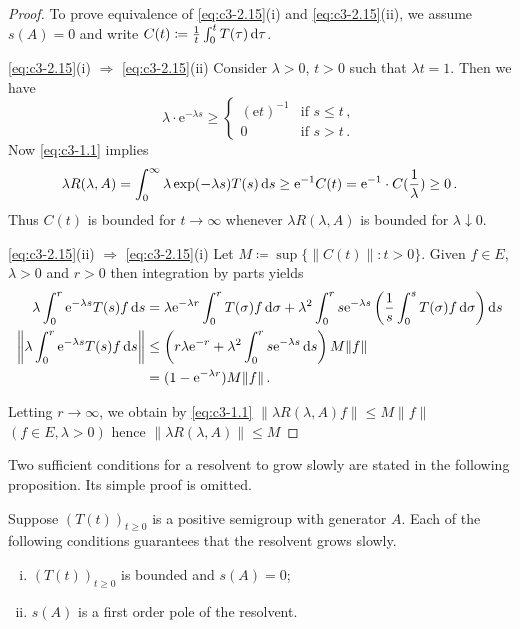 \begin{proof} 
To prove equivalence of \eqref{eq:c3-2.15}(i) and \eqref{eq:c3-2.15}(ii), we assume $s(A) = 0$ and write $C(t) \coloneqq \frac{1}{t} \int_{0}^{t} T(\tau) \mathop{}\!\mathrm{d}{\tau}$.

\eqref{eq:c3-2.15}(i) $\Rightarrow$ \eqref{eq:c3-2.15}(ii)\quad 
Consider $\lambda > 0$, $t > 0$ such that $\lambda t = 1$. 
Then we have
\[
\lambda \cdot \mathrm{e}^{-\lambda s} \geq 
\begin{cases}
	(\mathrm{e}t)^{-1} & \text{if } s \leq t\,, \\
	0 & \text{if } s > t\,.
\end{cases}
\]
Now \eqref{eq:c3-1.1} implies 
\[
\textit{$\lambda R(\lambda,A) = \int_{0}^{\infty} \lambda \exp(-\lambda s)T(s) \mathop{}\!\mathrm{d}{s} \geq \mathrm{e}^{-1}C(t) = \mathrm{e}^{-1}\cdot C(\frac{1}{\lambda}) \geq 0$}\,.
\]
Thus $C(t)$ is bounded for $t \to \infty$ whenever $\lambda R(\lambda,A)$ is bounded for $\lambda \downarrow 0$.

\eqref{eq:c3-2.15}(ii) $\Rightarrow$ \eqref{eq:c3-2.15}(i)\quad
 Let $M \coloneqq \sup\{\|C(t)\| : t > 0\}$.
Given $f \in E$, $\lambda > 0$ and $r > 0$ then integration by parts yields
\begin{align*}
	\lambda \int_{0}^{r} \mathrm{e}^{-\lambda s}T(s)f \mathop{}\!\mathrm{d}{s} &= \lambda \mathrm{e}^{-\lambda r} \int_{0}^{r} T(\sigma)f \mathop{}\!\mathrm{d}{\sigma} + \lambda^{2}\int_{0}^{r} s\mathrm{e}^{-\lambda s}\left(\frac{1}{s}\int_{0}^{s} T(\sigma)f \mathop{}\!\mathrm{d}{\sigma}\right)\mathop{}\!\mathrm{d}{s} \\
	\left\|\lambda \int_{0}^{r} \mathrm{e}^{-\lambda s}T(s)f \mathop{}\!\mathrm{d}{s}\right\| &\leq \left(r\lambda \mathrm{e}^{-r} + \lambda^{2}\int_{0}^{r} s\mathrm{e}^{-\lambda s} \mathop{}\!\mathrm{d}{s}\right)M\|f\| \\
	&= (1 - \mathrm{e}^{-\lambda r})M\|f\|\,.
\end{align*}

Letting $r \to \infty$, we obtain by \eqref{eq:c3-1.1} $\|\lambda R(\lambda,A)f\| \leq M\|f\|$ $(f \in E, \lambda > 0)$ hence $\|\lambda R(\lambda,A)\| \leq M$
\end{proof}
%
% 
Two sufficient conditions for a resolvent to grow slowly are stated in the following proposition.
Its simple proof is omitted.
\begin{proposition}\label{prop:c3-2.9}
	Suppose $(T(t))_{t\geq 0}$ is a positive semigroup with generator $A$.
	Each of the following conditions guarantees that the resolvent grows slowly.
	\begin{enumerate}[(i)]
		\item 
		$(T(t))_{t\geq 0}$ is bounded and $s(A) = 0$;
	
		\item 
		$s(A)$ is a first order pole of the resolvent.
	\end{enumerate}
\end{proposition}

